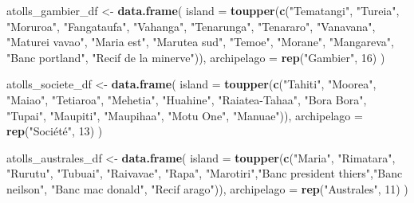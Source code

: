 \documentclass[
]{article}
\newenvironment{Shaded}{\begin{snugshade}}{\end{snugshade}}
\newcommand{\AttributeTok}[1]{\textcolor[rgb]{0.13,0.29,0.53}{#1}}
\newcommand{\DecValTok}[1]{\textcolor[rgb]{0.00,0.00,0.81}{#1}}
\newcommand{\FunctionTok}[1]{\textcolor[rgb]{0.13,0.29,0.53}{\textbf{#1}}}
\newcommand{\NormalTok}[1]{#1}
\newcommand{\OtherTok}[1]{\textcolor[rgb]{0.56,0.35,0.01}{#1}}
\newcommand{\StringTok}[1]{\textcolor[rgb]{0.31,0.60,0.02}{#1}}
\begin{document}
\begin{Shaded}
\begin{Highlighting}[]
\NormalTok{atolls\_gambier\_df }\OtherTok{\textless{}{-}} \FunctionTok{data.frame}\NormalTok{(}
  \AttributeTok{island =} \FunctionTok{toupper}\NormalTok{(}\FunctionTok{c}\NormalTok{(}\StringTok{"Tematangi"}\NormalTok{, }\StringTok{"Tureia"}\NormalTok{, }\StringTok{"Moruroa"}\NormalTok{, }\StringTok{"Fangataufa"}\NormalTok{,}
                  \StringTok{"Vahanga"}\NormalTok{, }\StringTok{"Tenarunga"}\NormalTok{, }\StringTok{"Tenararo"}\NormalTok{, }\StringTok{"Vanavana"}\NormalTok{, }\StringTok{"Maturei vavao"}\NormalTok{,}
                  \StringTok{"Maria est"}\NormalTok{, }\StringTok{"Marutea sud"}\NormalTok{, }\StringTok{"Temoe"}\NormalTok{, }\StringTok{"Morane"}\NormalTok{, }\StringTok{"Mangareva"}\NormalTok{,}
                  \StringTok{"Banc portland"}\NormalTok{, }\StringTok{"Recif de la minerve"}\NormalTok{)),}
  \AttributeTok{archipelago =} \FunctionTok{rep}\NormalTok{(}\StringTok{"Gambier"}\NormalTok{, }\DecValTok{16}\NormalTok{)}
\NormalTok{)}

\NormalTok{atolls\_societe\_df }\OtherTok{\textless{}{-}} \FunctionTok{data.frame}\NormalTok{(}
  \AttributeTok{island =} \FunctionTok{toupper}\NormalTok{(}\FunctionTok{c}\NormalTok{(}\StringTok{"Tahiti"}\NormalTok{, }\StringTok{"Moorea"}\NormalTok{, }\StringTok{"Maiao"}\NormalTok{, }\StringTok{"Tetiaroa"}\NormalTok{, }\StringTok{"Mehetia"}\NormalTok{,}
                  \StringTok{"Huahine"}\NormalTok{, }\StringTok{"Raiatea{-}Tahaa"}\NormalTok{, }\StringTok{"Bora Bora"}\NormalTok{, }\StringTok{"Tupai"}\NormalTok{, }\StringTok{"Maupiti"}\NormalTok{,}
                  \StringTok{"Maupihaa"}\NormalTok{, }\StringTok{"Motu One"}\NormalTok{, }\StringTok{"Manuae"}\NormalTok{)),}
  \AttributeTok{archipelago =} \FunctionTok{rep}\NormalTok{(}\StringTok{"Société"}\NormalTok{, }\DecValTok{13}\NormalTok{)}
\NormalTok{)}

\NormalTok{atolls\_australes\_df }\OtherTok{\textless{}{-}} \FunctionTok{data.frame}\NormalTok{(}
  \AttributeTok{island =} \FunctionTok{toupper}\NormalTok{(}\FunctionTok{c}\NormalTok{(}\StringTok{"Maria"}\NormalTok{, }\StringTok{"Rimatara"}\NormalTok{, }\StringTok{"Rurutu"}\NormalTok{, }\StringTok{"Tubuai"}\NormalTok{, }\StringTok{"Raivavae"}\NormalTok{, }\StringTok{"Rapa"}\NormalTok{,}
                  \StringTok{"Marotiri"}\NormalTok{,}\StringTok{"Banc president thiers"}\NormalTok{,}\StringTok{"Banc neilson"}\NormalTok{,}
                  \StringTok{"Banc mac donald"}\NormalTok{, }\StringTok{"Recif arago"}\NormalTok{)),}
  \AttributeTok{archipelago =} \FunctionTok{rep}\NormalTok{(}\StringTok{"Australes"}\NormalTok{, }\DecValTok{11}\NormalTok{)}
\NormalTok{)}


\end{Highlighting}
\end{Shaded}
\end{document}
